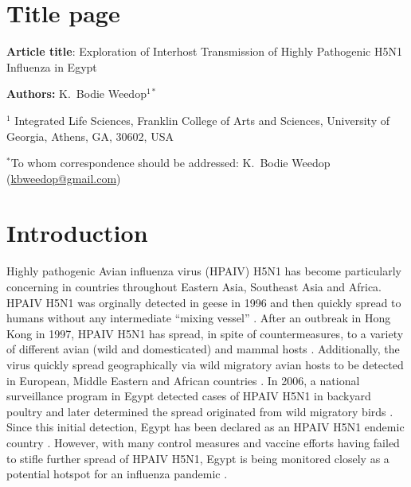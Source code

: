 \documentclass[10pt,english]{article}
\begin{document}
\setlength{\parindent}{0pt}

\section*{Title page}

\textbf{Article title}: Exploration of Interhost Transmission of Highly Pathogenic H5N1 Influenza in Egypt

\textbf{Authors:} K.\ Bodie Weedop$^{1*}$

$^1$ Integrated Life Sciences, Franklin College of Arts and Sciences, University of Georgia, Athens, GA, 30602, USA

$^*$To whom correspondence should be addressed: K.\ Bodie Weedop (\url{kbweedop@gmail.com})

\clearpage

\section*{Introduction}
Highly pathogenic Avian influenza virus (HPAIV) H5N1 has become particularly concerning in countries throughout Eastern Asia, Southeast Asia and Africa. HPAIV H5N1 was orginally detected in geese in 1996 and then quickly spread to humans without any intermediate ``mixing vessel'' \autocite{Claas1998, Chen2005}. After an outbreak in Hong Kong in 1997, HPAIV H5N1 has spread, in spite of countermeasures, to a variety of different avian (wild and domesticated) and mammal hosts \autocite{Chan2002, Kaplan2013}. Additionally, the virus quickly spread geographically via wild migratory avian hosts to be detected in European, Middle Eastern and African countries \autocite{Alexander2007, Salzberg2007}. In 2006, a national surveillance program in Egypt detected cases of HPAIV H5N1 in backyard poultry and later determined the spread originated from wild migratory birds \autocite{Saad2007, Abdelwhab2015}. Since this initial detection, Egypt has been declared as an HPAIV H5N1 endemic country \autocite{International2007}. However, with many control measures and vaccine efforts having failed to stifle further spread of HPAIV H5N1, Egypt is being monitored closely as a potential hotspot for an influenza pandemic \autocite{Kayali2011, Kayali2016, Young2018}. 
\end{document}
